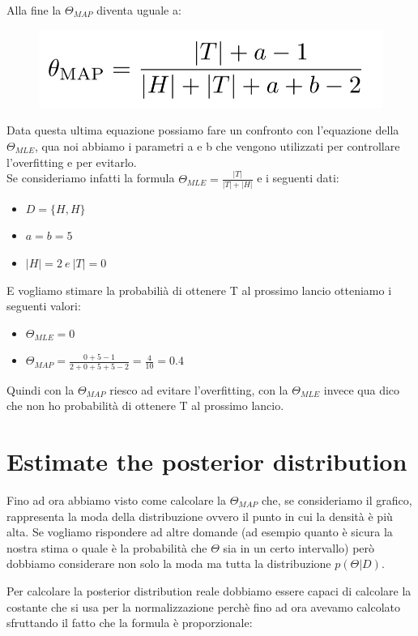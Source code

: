 \documentclass[14pt]{extreport}
\begin{document}
Alla fine la $\Theta_{MAP}$ diventa uguale a:
\begin{figure}[H]
\centering
\includegraphics[width=0.4\linewidth]{42.jpeg}
\end{figure}

Data questa ultima equazione possiamo fare un confronto con l'equazione della $\Theta_{MLE}$, qua noi abbiamo i parametri a e b che vengono utilizzati
per controllare l'overfitting e per evitarlo. \\
Se consideriamo infatti la formula $\Theta_{MLE} = \frac{|T|}{|T|+|H|}$ e i seguenti dati:
\begin{itemize}
	\item $D = \{H, H\}$ 
	\item $a=b=5$
	\item $|H| = 2 \ e\ |T| = 0$
\end{itemize}

E vogliamo stimare la probabilià di ottenere T al prossimo lancio otteniamo i seguenti valori:
\begin{itemize}
\item $\Theta_{MLE} = 0$
\item $\Theta_{MAP} = \frac{0+5-1}{2+0+5+5-2} = \frac{4}{10} = 0.4$
\end{itemize}

Quindi con la $\Theta_{MAP}$ riesco ad evitare l'overfitting, con la $\Theta_{MLE}$ invece qua dico che non ho probabilità di ottenere T al prossimo
lancio.

\section{Estimate the posterior distribution}

Fino ad ora abbiamo visto come calcolare la $\Theta_{MAP}$ che, se consideriamo il grafico, rappresenta la moda della distribuzione ovvero il punto in
cui la densità è più alta. Se vogliamo rispondere ad altre domande (ad esempio quanto è sicura la nostra stima o quale è la probabilità che $\Theta$
sia in un certo intervallo) però dobbiamo considerare non solo la moda ma tutta la distribuzione $p(\Theta | D)$.

Per calcolare la posterior distribution reale dobbiamo essere capaci di calcolare la costante che si usa per la normalizzazione perchè fino ad ora
avevamo calcolato sfruttando il fatto che la formula è proporzionale:
\end{document}
